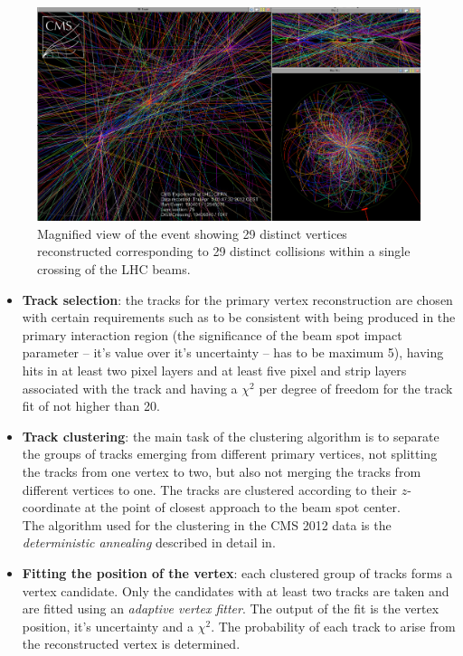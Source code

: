 \begin{figure}[t]
  \centering
  \includegraphics[width=1.0\textwidth]{04_event_reconstruction/plots/url.png}
  \caption{Magnified view of the event showing 29 distinct vertices reconstructed corresponding to 29 distinct collisions within a single crossing of the LHC beams.}
  \label{fig:HugePU}
\end{figure}
\begin{itemize}

 \item \textbf{Track selection}: the tracks for the primary vertex reconstruction are chosen with certain requirements such as to be consistent with being produced 
 in the primary interaction region (the significance of the beam spot impact parameter -- it's value over it's uncertainty -- has to be maximum 5), having hits in at least two pixel 
 layers and at least five pixel and strip layers associated with the track and having a $\chi^{2}$ per degree of freedom for the track fit of not higher than 20.
 \item \textbf{Track clustering}: the main task of the clustering algorithm is to separate the groups of tracks emerging from different primary vertices, not splitting 
 the tracks from one vertex to two, but also not merging the tracks from different vertices to one. The tracks are clustered according 
 to their $z$-coordinate at the point of closest approach to the beam spot center. 
 \\
 The algorithm used for the clustering in the CMS 2012 data is the \textit{deterministic annealing} described in detail in\cite{rose_ieee1998}. 
 \item \textbf{Fitting the position of the vertex}: each clustered group of tracks forms a vertex candidate. Only the candidates with at least two tracks are taken and are fitted
 using an \textit{adaptive vertex fitter}\cite{Frühwirth:1027031}. The output of the fit is the vertex position, it's uncertainty and a $\chi^{2}$. The probability
 of each track to arise from the reconstructed vertex is determined.
\end{itemize}

